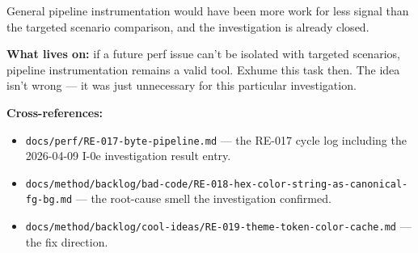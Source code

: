 General pipeline instrumentation would have been more work for less signal than the targeted scenario comparison, and the investigation is already closed.

\textbf{What lives on:} if a future perf issue can't be isolated with targeted scenarios, pipeline instrumentation remains a valid tool. Exhume this task then. The idea isn't wrong --- it was just unnecessary for this particular investigation.

\textbf{Cross-references:}

\begin{itemize}
\tightlist
\item
  \texttt{d\allowbreak{}o\allowbreak{}c\allowbreak{}s\allowbreak{}/\allowbreak{}p\allowbreak{}e\allowbreak{}r\allowbreak{}f\allowbreak{}/\allowbreak{}R\allowbreak{}E\allowbreak{}-\allowbreak{}0\allowbreak{}1\allowbreak{}7\allowbreak{}-\allowbreak{}b\allowbreak{}y\allowbreak{}t\allowbreak{}e\allowbreak{}-\allowbreak{}p\allowbreak{}i\allowbreak{}p\allowbreak{}e\allowbreak{}l\allowbreak{}i\allowbreak{}n\allowbreak{}e\allowbreak{}.\allowbreak{}m\allowbreak{}d} --- the RE-017 cycle log including the 2026-04-09 I-0e investigation result entry.
\item
  \texttt{d\allowbreak{}o\allowbreak{}c\allowbreak{}s\allowbreak{}/\allowbreak{}m\allowbreak{}e\allowbreak{}t\allowbreak{}h\allowbreak{}o\allowbreak{}d\allowbreak{}/\allowbreak{}b\allowbreak{}a\allowbreak{}c\allowbreak{}k\allowbreak{}l\allowbreak{}o\allowbreak{}g\allowbreak{}/\allowbreak{}b\allowbreak{}a\allowbreak{}d\allowbreak{}-\allowbreak{}c\allowbreak{}o\allowbreak{}d\allowbreak{}e\allowbreak{}/\allowbreak{}R\allowbreak{}E\allowbreak{}-\allowbreak{}0\allowbreak{}1\allowbreak{}8\allowbreak{}-\allowbreak{}h\allowbreak{}e\allowbreak{}x\allowbreak{}-\allowbreak{}c\allowbreak{}o\allowbreak{}l\allowbreak{}o\allowbreak{}r\allowbreak{}-\allowbreak{}s\allowbreak{}t\allowbreak{}r\allowbreak{}i\allowbreak{}n\allowbreak{}g\allowbreak{}-\allowbreak{}a\allowbreak{}s\allowbreak{}-\allowbreak{}c\allowbreak{}a\allowbreak{}n\allowbreak{}o\allowbreak{}n\allowbreak{}i\allowbreak{}c\allowbreak{}a\allowbreak{}l\allowbreak{}-\allowbreak{}f\allowbreak{}g\allowbreak{}-\allowbreak{}b\allowbreak{}g\allowbreak{}.\allowbreak{}m\allowbreak{}d} --- the root-cause smell the investigation confirmed.
\item
  \texttt{d\allowbreak{}o\allowbreak{}c\allowbreak{}s\allowbreak{}/\allowbreak{}m\allowbreak{}e\allowbreak{}t\allowbreak{}h\allowbreak{}o\allowbreak{}d\allowbreak{}/\allowbreak{}b\allowbreak{}a\allowbreak{}c\allowbreak{}k\allowbreak{}l\allowbreak{}o\allowbreak{}g\allowbreak{}/\allowbreak{}c\allowbreak{}o\allowbreak{}o\allowbreak{}l\allowbreak{}-\allowbreak{}i\allowbreak{}d\allowbreak{}e\allowbreak{}a\allowbreak{}s\allowbreak{}/\allowbreak{}R\allowbreak{}E\allowbreak{}-\allowbreak{}0\allowbreak{}1\allowbreak{}9\allowbreak{}-\allowbreak{}t\allowbreak{}h\allowbreak{}e\allowbreak{}m\allowbreak{}e\allowbreak{}-\allowbreak{}t\allowbreak{}o\allowbreak{}k\allowbreak{}e\allowbreak{}n\allowbreak{}-\allowbreak{}c\allowbreak{}o\allowbreak{}l\allowbreak{}o\allowbreak{}r\allowbreak{}-\allowbreak{}c\allowbreak{}a\allowbreak{}c\allowbreak{}h\allowbreak{}e\allowbreak{}.\allowbreak{}m\allowbreak{}d} --- the fix direction.
\end{itemize}

